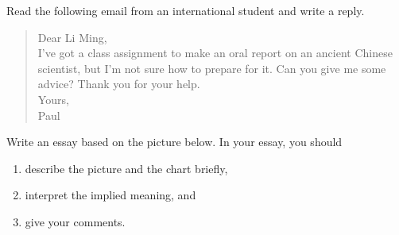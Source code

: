 \documentclass[12pt,a4paper]{article}
\begin{document}
\begin{shortessay}{
Read the following email from an international student and write a reply.

\begin{quote}
Dear Li Ming,\\
I've got a class assignment to make an oral report on an ancient Chinese scientist, but I'm not sure how to prepare for it. Can you give me some advice? Thank you for your help.\\
Yours,\\
Paul
\end{quote}
}
\end{shortessay}

\begin{longessay}{
Write an essay based on the picture below. In your essay, you should
\begin{enumerate}[leftmargin=1.5em, 
  itemsep=0pt,
  parsep=0pt,
  topsep=3pt]
  \item describe the picture and the chart briefly,
  \item interpret the implied meaning, and
  \item give your comments.
\end{enumerate}
}
\begin{center}
\end{center}
\end{longessay}
\end{document}
